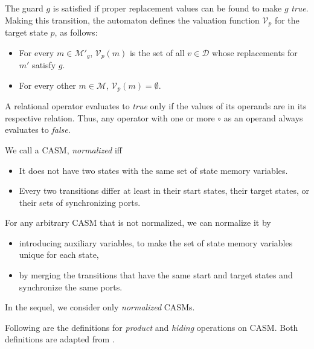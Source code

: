 The guard $g$ is satisfied if proper replacement values can be found to make $g$ \emph{true}. Making this transition, the automaton defines the valuation function $\mathcal{V}_p$ for the target state $p$, as follows:
\begin{itemize}
\item For every $m \in \mathcal{ M}'_g$, $\mathcal{V}_p(m)$ is the set of all $v \in \mathcal{D}$ whose replacements for $m'$ satisfy $g$. 
\item For every other $m \in \mathcal{M}$, $\mathcal{V}_p(m) = \emptyset$. 
\end{itemize}

A relational operator evaluates to \emph{true} only if the values of its operands are in its respective relation. Thus, any operator with one or more $\circ$ as an operand always evaluates to \emph{false}. 

We call a CASM, \emph{normalized} iff 
\begin{itemize}
\item  It does not have two states with the same set of state memory variables.
\item Every two transitions differ at least in their start states, their target states, or their sets of synchronizing ports. 
\end{itemize}

 For any arbitrary CASM that is not normalized, we can normalize it by 
 \begin{itemize}
\item introducing auxiliary variables, to make the set of state memory variables unique for each state, 
\item by merging the transitions that have the same start and target states and synchronize the same ports. 
\end{itemize}

In the sequel, we consider only \emph{normalized} CASMs.

Following are the definitions for \emph{product} and \emph{hiding} operations on CASM. Both definitions are adapted from \cite{BaierCA}.

